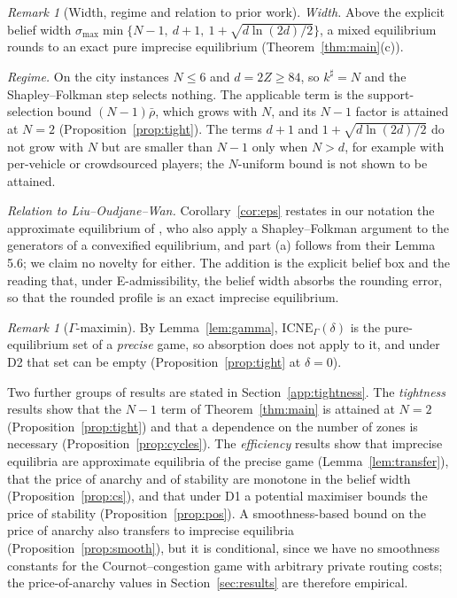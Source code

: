 \documentclass[preprint,11pt]{elsarticle}
\theoremstyle{definition}
\theoremstyle{remark}
\newtheorem{remark}[theorem]{Remark}
\newcommand{\ICNE}{\mathrm{ICNE}}
\begin{document}
\begin{remark}[Width, regime and relation to prior work]\label{rem:regime}
\emph{Width.} Above the explicit belief width $\sigma_{\max}\min\{N-1,\ d+1,\ 1+\sqrt{d\ln(2d)/2}\}$, a mixed equilibrium rounds to an exact pure imprecise equilibrium (Theorem~\ref{thm:main}(c)).

\emph{Regime.} On the city instances $N\le6$ and $d=2Z\ge84$, so $k^\sharp=N$ and the Shapley--Folkman step selects nothing. The applicable term is the support-selection bound $(N-1)\bar\rho$, which grows with $N$, and its $N-1$ factor is attained at $N=2$ (Proposition~\ref{prop:tight}). The terms $d+1$ and $1+\sqrt{d\ln(2d)/2}$ do not grow with $N$ but are smaller than $N-1$ only when $N>d$, for example with per-vehicle or crowdsourced players; the $N$-uniform bound is not shown to be attained.

\emph{Relation to Liu--Oudjane--Wan.} Corollary~\ref{cor:eps} restates in our notation the approximate equilibrium of \citet{Liu2023}, who also apply a Shapley--Folkman argument to the generators of a convexified equilibrium, and part (a) follows from their Lemma 5.6; we claim no novelty for either. The addition is the explicit belief box and the reading that, under E-admissibility, the belief width absorbs the rounding error, so that the rounded profile is an exact imprecise equilibrium.
\end{remark}

\begin{remark}[$\Gamma$-maximin]\label{rem:gamma-abs}
By Lemma~\ref{lem:gamma}, $\ICNE_\Gamma(\delta)$ is the pure-equilibrium set of a \emph{precise} game, so absorption does not apply to it, and under D2 that set can be empty (Proposition~\ref{prop:tight} at $\delta=0$).
\end{remark}

Two further groups of results are stated in Section~\ref{app:tightness}. The \emph{tightness} results show that the $N-1$ term of Theorem~\ref{thm:main} is attained at $N=2$ (Proposition~\ref{prop:tight}) and that a dependence on the number of zones is necessary (Proposition~\ref{prop:cycles}). The \emph{efficiency} results show that imprecise equilibria are approximate equilibria of the precise game (Lemma~\ref{lem:transfer}), that the price of anarchy and of stability are monotone in the belief width (Proposition~\ref{prop:cs}), and that under D1 a potential maximiser bounds the price of stability (Proposition~\ref{prop:pos}). A smoothness-based bound on the price of anarchy also transfers to imprecise equilibria (Proposition~\ref{prop:smooth}), but it is conditional, since we have no smoothness constants for the Cournot--congestion game with arbitrary private routing costs; the price-of-anarchy values in Section~\ref{sec:results} are therefore empirical.
\end{document}
